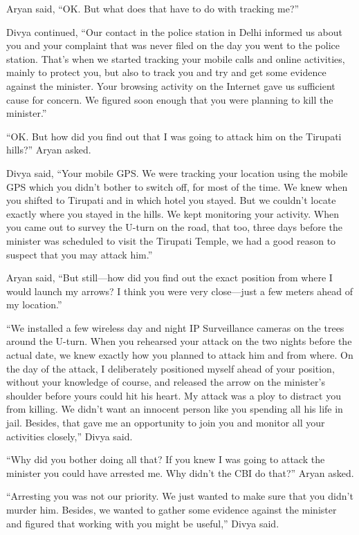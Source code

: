 Aryan said, “OK. But what does that have to do with tracking me?”

Divya continued, “Our contact in the police station in Delhi informed us about
you and your complaint that was never filed on the day you went to the police
station. That's when we started tracking your mobile calls and online
activities, mainly to protect you, but also to track you and try and get some
evidence against the minister. Your browsing activity on the Internet gave us
sufficient cause for concern. We figured soon enough that you were planning to
kill the minister.”

“OK. But how did you find out that I was going to attack him on the Tirupati
hills?” Aryan asked.

Divya said, “Your mobile GPS. We were tracking your location using the mobile
GPS which you didn't bother to switch off, for most of the time. We knew when
you shifted to Tirupati and in which hotel you stayed. But we couldn't locate
exactly where you stayed in the hills. We kept monitoring your activity. When
you came out to survey the U-turn on the road, that too, three days before the
minister was scheduled to visit the Tirupati Temple, we had a good reason to
suspect that you may attack him.”

Aryan said, “But still—how did you find out the exact position from where I
would launch my arrows? I think you were very close—just a few meters ahead of
my location.”

“We installed a few wireless day and night IP Surveillance cameras on the trees
around the U-turn. When you rehearsed your attack on the two nights before the
actual date, we knew exactly how you planned to attack him and from where. On
the day of the attack, I deliberately positioned myself ahead of your position,
without your knowledge of course, and released the arrow on the minister's
shoulder before yours could hit his heart. My attack was a ploy to distract you
from killing. We didn't want an innocent person like you spending all his life
in jail. Besides, that gave me an opportunity to join you and monitor all your
activities closely,” Divya said.

“Why did you bother doing all that? If you knew I was going to attack the
minister you could have arrested me. Why didn't the CBI do that?” Aryan asked.

“Arresting you was not our priority. We just wanted to make sure that you didn't
murder him. Besides, we wanted to gather some evidence against the minister and
figured that working with you might be useful,” Divya said.

